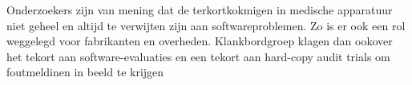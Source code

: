 \documentclass{article}
\begin{document}
	Onderzoekers zijn van mening dat de terkortkokmigen in medische apparatuur niet geheel en altijd te verwijten zijn aan softwareproblemen. Zo is er ook een rol weggelegd voor fabrikanten en overheden.
	Klankbordgroep klagen dan ookover het tekort aan software-evaluaties en een tekort aan hard-copy audit trials om foutmeldinen in beeld te krijgen
\end{document}
